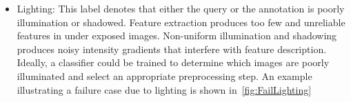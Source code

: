 \begin{itemize}
                \FailQuality{}

            \item Lighting:
            This label denotes that either the query or the
              \groundtrue{} annotation is poorly illumination or
              shadowed.
            Feature extraction produces too few and unreliable features
              in under exposed images.
            Non-uniform illumination and shadowing produces noisy
              intensity gradients that interfere with feature
              description.
            Ideally, a classifier could be trained to determine which
              images are poorly illuminated and select an appropriate
              preprocessing step.
            An example illustrating a failure case due to lighting is
              shown in~\cref{fig:FailLighting}

                \FailLighting{}




\end{itemize}
